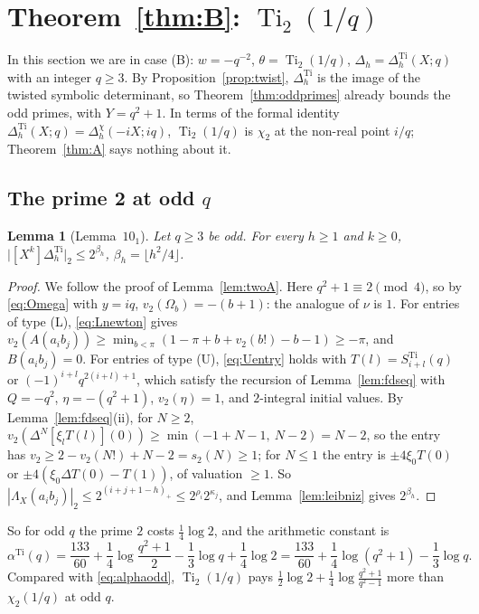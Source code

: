 \documentclass[11pt]{amsart}
\newtheorem{lemma}[theorem]{Lemma}
\theoremstyle{definition}
\theoremstyle{remark}
\numberwithin{equation}{section}
\newcommand{\Ti}{\operatorname{Ti}}
\begin{document}
\section{\texorpdfstring{Theorem~\ref{thm:B}: $\Ti_2(1/q)$}{Theorem B: Ti2(1/q)}}\label{sec:B}

In this section we are in case (B): $w=-q^{-2}$, $\theta=\Ti_2(1/q)$, $\Delta_h=\Delta^{\Ti}_h(X;q)$ with an integer $q\ge3$.
By Proposition~\ref{prop:twist}, $\Delta^{\Ti}_h$ is the image of the twisted symbolic determinant, so
Theorem~\ref{thm:oddprimes} already bounds the odd primes, with $Y=q^2+1$. In terms of the formal identity
$\Delta^{\Ti}_h(X;q)=\Delta^\chi_h(-iX;iq)$, $\Ti_2(1/q)$ is $\chi_2$ at the non-real point $i/q$; Theorem~\ref{thm:A} says
nothing about it.

\subsection{The prime 2 at odd \texorpdfstring{$q$}{q}}

\begin{lemma}[Lemma~$10_1$]\label{lem:ten1}
Let $q\ge3$ be odd. For every $h\ge1$ and $k\ge0$, $\bigl|[X^k]\Delta^{\Ti}_h\bigr|_2\le2^{\beta_h}$, $\beta_h=\lfloor h^2/4\rfloor$.
\end{lemma}

\begin{proof}
We follow the proof of Lemma~\ref{lem:twoA}. Here $q^2+1\equiv2\pmod4$, so by \eqref{eq:Omega} with $y=iq$,
$v_2(\Omega_b)=-(b+1)$: the analogue of $\nu$ is $1$. For entries of type (L), \eqref{eq:Lnewton} gives
$v_2(A(a_ib_j))\ge\min_{b<\pi}(1-\pi+b+v_2(b!)-b-1)\ge-\pi$, and $B(a_ib_j)=0$. For entries of type (U), \eqref{eq:Uentry}
holds with $T(l)=S^{\Ti}_{i+l}(q)$ or $(-1)^{i+l}q^{2(i+l)+1}$, which satisfy the recursion of Lemma~\ref{lem:fdseq} with
$Q=-q^2$, $\eta=-(q^2+1)$, $v_2(\eta)=1$, and $2$-integral initial values. By Lemma~\ref{lem:fdseq}(ii), for $N\ge2$,
$v_2(\Delta^N[\xi_lT(l)](0))\ge\min(-1+N-1,\ N-2)=N-2$, so the entry has $v_2\ge2-v_2(N!)+N-2=s_2(N)\ge1$; for $N\le1$
the entry is $\pm4\xi_0T(0)$ or $\pm4(\xi_0\Delta T(0)-T(1))$, of valuation $\ge1$. So
$|\Lambda_X(a_ib_j)|_2\le2^{(i+j+1-h)_+}\le2^{\rho_i}2^{\kappa_j}$, and Lemma~\ref{lem:leibniz} gives $2^{\beta_h}$.
\end{proof}

So for odd $q$ the prime $2$ costs $\frac14\log2$, and the arithmetic constant is
\begin{equation}\label{eq:alphaTi}
  \alpha^{\Ti}(q)=\frac{133}{60}+\frac14\log\frac{q^2+1}2-\frac13\log q+\frac14\log2=\frac{133}{60}+\frac14\log(q^2+1)-\frac13\log q .
\end{equation}
Compared with \eqref{eq:alphaodd}, $\Ti_2(1/q)$ pays $\frac12\log2+\frac14\log\frac{q^2+1}{q^2-1}$ more than
$\chi_2(1/q)$ at odd $q$.
\end{document}
